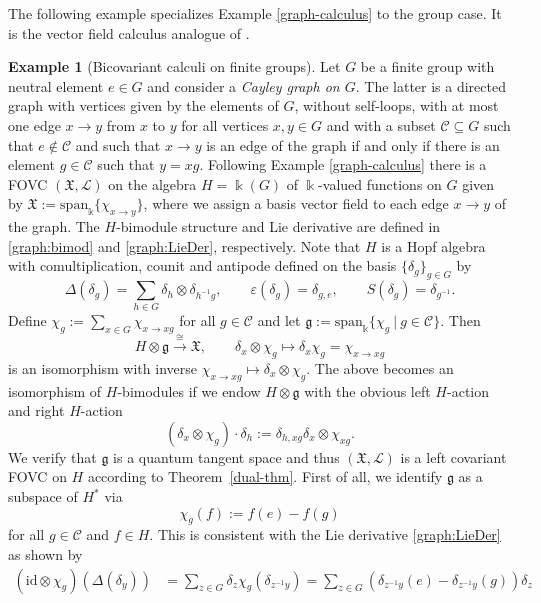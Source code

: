 \documentclass{article}
\theoremstyle{definition}
\newtheorem{example}[thm]{Example}
\begin{document}
	The following example specializes Example \ref{graph-calculus} to the group case. It is the vector field calculus analogue of \cite[Proposition 1.52]{bm}.
	
	\begin{example}[Bicovariant calculi on finite groups]
		Let $G$ be a finite group with neutral element $e\in G$ and consider a \textit{Cayley graph on $G$}. The latter is a directed graph with vertices given by the elements of $G$, without self-loops, with at most one edge $x\to y$ from $x$ to $y$ for all vertices $x,y\in G$ and with a subset $\mathcal{C}\subseteq G$ such that $e\notin\mathcal{C}$ and such that $x\to y$ is an edge of the graph if and only if there is an element $g\in\mathcal{C}$ such that $y=xg$. Following Example \ref{graph-calculus} there is a FOVC $(\mathfrak{X},\mathscr{L})$ on the algebra $H=\Bbbk(G)$ of $\Bbbk$-valued functions on $G$ given by $\mathfrak{X}:=\mathrm{span}_\Bbbk\{\chi_{x\to y}\}$, where we assign a basis vector field to each edge $x\to y$ of the graph. The $H$-bimodule structure and Lie derivative are defined in \eqref{graph:bimod} and \eqref{graph:LieDer}, respectively. Note that $H$ is a Hopf algebra with comultiplication, counit and antipode defined on the basis $\{\delta_g\}_{g\in G}$ by
		$$
		\Delta(\delta_g)=\sum_{h\in G}\delta_h\otimes\delta_{h^{-1}g},\qquad
		\varepsilon(\delta_g)=\delta_{g,e},\qquad
		S(\delta_g)=\delta_{g^{-1}}.
		$$
		Define $\chi_g:=\sum_{x\in G}\chi_{x\to xg}$ for all $g\in\mathcal{C}$ and let $\mathfrak{g}:=\mathrm{span}_\Bbbk\{\chi_g~|~g\in\mathcal{C}\}$. Then
		$$
		H\otimes\mathfrak{g}\xrightarrow{\cong}\mathfrak{X},\qquad \delta_x\otimes\chi_g\mapsto\delta_x\chi_g=\chi_{x\to xg}
		$$
		is an isomorphism with inverse $\chi_{x\to xg}\mapsto\delta_x\otimes\chi_g$. The above becomes an isomorphism of $H$-bimodules if we endow $H\otimes\mathfrak{g}$ with the obvious left $H$-action and right $H$-action
		$$
		(\delta_x\otimes\chi_g)\cdot \delta_h:=\delta_{h,xg}\delta_x\otimes\chi_{xg}.
		$$
		We verify that $\mathfrak{g}$ is a quantum tangent space and thus $(\mathfrak{X},\mathscr{L})$ is a left covariant FOVC on $H$ according to Theorem~\ref{dual-thm}. First of all, we identify $\mathfrak{g}$ as a subspace of $H^*$ via 
		$$
		\chi_g(f):=f(e)-f(g)
		$$
		for all $g\in\mathcal{C}$ and $f\in H$. This is consistent with the Lie derivative \eqref{graph:LieDer} as shown by 
		\begin{align*}
			(\mathrm{id}\otimes\chi_g)(\Delta(\delta_y))
			&=\sum_{z\in G}\delta_z\chi_g(\delta_{z^{-1}y})
			=\sum_{z\in G}(\delta_{z^{-1}y}(e)-\delta_{z^{-1}y}(g))\delta_z

\end{align*}
\end{example}
\end{document}
